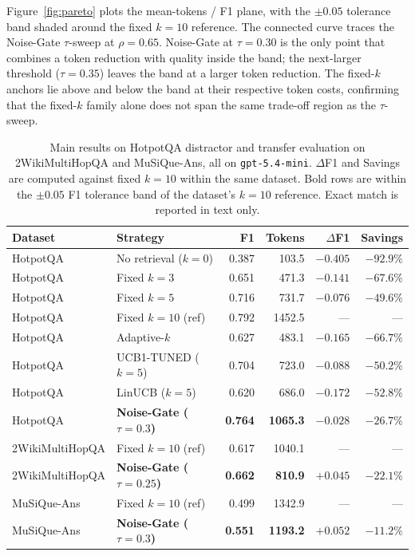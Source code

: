 \documentclass[runningheads]{llncs}
\begin{document}
Figure~\ref{fig:pareto} plots the mean-tokens / F1 plane, with the $\pm 0.05$ tolerance band shaded around the fixed $k{=}10$ reference. The connected curve traces the Noise-Gate $\tau$-sweep at $\rho{=}0.65$. Noise-Gate at $\tau{=}0.30$ is the only point that combines a token reduction with quality inside the band; the next-larger threshold ($\tau{=}0.35$) leaves the band at a larger token reduction. The fixed-$k$ anchors lie above and below the band at their respective token costs, confirming that the fixed-$k$ family alone does not span the same trade-off region as the $\tau$-sweep.

\begin{table}[t]
\centering
\small
\caption{Main results on HotpotQA distractor and transfer evaluation on 2WikiMultiHopQA and MuSiQue-Ans, all on \texttt{gpt-5.4-mini}. $\Delta$F1 and Savings are computed against fixed $k{=}10$ within the same dataset. Bold rows are within the $\pm 0.05$ F1 tolerance band of the dataset's $k{=}10$ reference. Exact match is reported in text only.}
\label{tab:main_results}
\begin{tabular}{llrrrr}
\toprule
Dataset & Strategy & F1 & Tokens & $\Delta$F1 & Savings \\
\midrule
HotpotQA & No retrieval ($k{=}0$) & 0.387 & 103.5 & $-0.405$ & $-92.9\%$ \\
HotpotQA & Fixed $k{=}3$ & 0.651 & 471.3 & $-0.141$ & $-67.6\%$ \\
HotpotQA & Fixed $k{=}5$ & 0.716 & 731.7 & $-0.076$ & $-49.6\%$ \\
HotpotQA & Fixed $k{=}10$ (ref) & 0.792 & 1452.5 & --- & --- \\
HotpotQA & Adaptive-$k$ & 0.627 & 483.1 & $-0.165$ & $-66.7\%$ \\
HotpotQA & UCB1-TUNED ($k{=}5$) & 0.704 & 723.0 & $-0.088$ & $-50.2\%$ \\
HotpotQA & LinUCB ($k{=}5$) & 0.620 & 686.0 & $-0.172$ & $-52.8\%$ \\
HotpotQA & \textbf{Noise-Gate ($\tau{=}0.3$)} & \textbf{0.764} & \textbf{1065.3} & $\mathbf{-0.028}$ & $\mathbf{-26.7\%}$ \\
\midrule
2WikiMultiHopQA & Fixed $k{=}10$ (ref) & 0.617 & 1040.1 & --- & --- \\
2WikiMultiHopQA & \textbf{Noise-Gate ($\tau{=}0.25$)} & \textbf{0.662} & \textbf{810.9} & $\mathbf{+0.045}$ & $\mathbf{-22.1\%}$ \\
\midrule
MuSiQue-Ans & Fixed $k{=}10$ (ref) & 0.499 & 1342.9 & --- & --- \\
MuSiQue-Ans & \textbf{Noise-Gate ($\tau{=}0.3$)} & \textbf{0.551} & \textbf{1193.2} & $\mathbf{+0.052}$ & $\mathbf{-11.2\%}$ \\
\bottomrule
\end{tabular}
\end{table}
\end{document}
